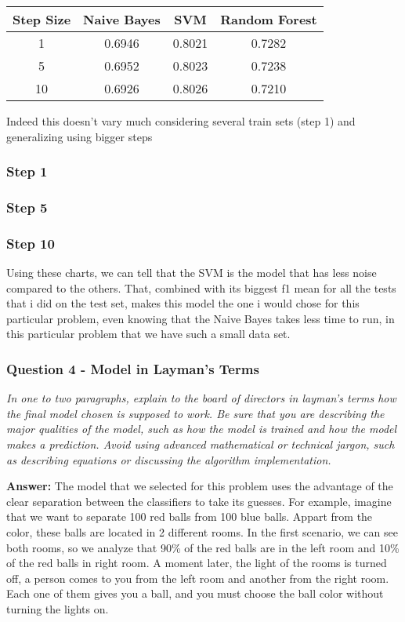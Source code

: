 \documentclass[11pt]{article}
\begin{document}
\begin{longtable}[]{@{}cccc@{}}
\toprule
Step Size & Naive Bayes & SVM & Random Forest\tabularnewline
\midrule
\endhead
1 & 0.6946 & 0.8021 & 0.7282\tabularnewline
5 & 0.6952 & 0.8023 & 0.7238\tabularnewline
10 & 0.6926 & 0.8026 & 0.7210\tabularnewline
\bottomrule
\end{longtable}

Indeed this doesn't vary much considering several train sets (step 1)
and generalizing using bigger steps

    \subsubsection{Step 1}\label{step-1}

\subsubsection{Step 5}\label{step-5}

\subsubsection{Step 10}\label{step-10}

    Using these charts, we can tell that the SVM is the model that has less
noise compared to the others. That, combined with its biggest f1 mean
for all the tests that i did on the test set, makes this model the one i
would chose for this particular problem, even knowing that the Naive
Bayes takes less time to run, in this particular problem that we have
such a small data set.

    \subsubsection{Question 4 - Model in Layman's
Terms}\label{question-4---model-in-laymans-terms}

\emph{In one to two paragraphs, explain to the board of directors in
layman's terms how the final model chosen is supposed to work. Be sure
that you are describing the major qualities of the model, such as how
the model is trained and how the model makes a prediction. Avoid using
advanced mathematical or technical jargon, such as describing equations
or discussing the algorithm implementation.}

    \textbf{Answer: } The model that we selected for this problem uses the
advantage of the clear separation between the classifiers to take its
guesses. For example, imagine that we want to separate 100 red balls
from 100 blue balls. Appart from the color, these balls are located in 2
different rooms. In the first scenario, we can see both rooms, so we
analyze that 90\% of the red balls are in the left room and 10\% of the
red balls in right room. A moment later, the light of the rooms is
turned off, a person comes to you from the left room and another from
the right room. Each one of them gives you a ball, and you must choose
the ball color without turning the lights on.
\end{document}
